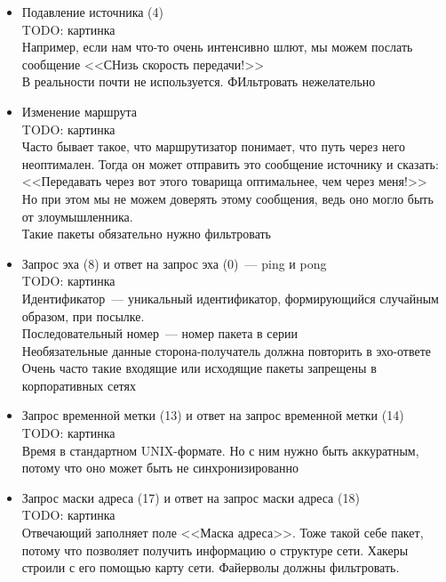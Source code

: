 
\begin{itemize}
    \item Подавление источника (4)\\
    TODO: картинка\\
    Например, если нам что-то очень интенсивно шлют, мы можем послать сообщение <<СНизь скорость передачи!>>\\
    В реальности почти не используется. ФИльтровать нежелательно
    \item Изменение маршрута\\
    TODO: картинка\\
    Часто бывает такое, что маршрутизатор понимает, что путь через него неоптимален. Тогда он может отправить это сообщение источнику и сказать: <<Передавать через вот этого товарища оптимальнее, чем через меня!>>\\
    Но при этом мы не можем доверять этому сообщения, ведь оно могло быть от злоумышленника.\\
    Такие пакеты обязательно нужно фильтровать
\end{itemize}


\begin{itemize}
    \item Запрос эха (8) и ответ на запрос эха (0)~--- ping и pong\\
    TODO: картинка\\
    Идентификатор~--- уникальный идентификатор, формирующийся случайным образом, при посылке.\\
    Последовательный номер~--- номер пакета в серии\\
    Необязательные данные сторона-получатель должна повторить в эхо-ответе\\
    Очень часто такие входящие или исходящие пакеты запрещены в корпоративных сетях 
    \item Запрос временной метки (13) и ответ на запрос временной метки (14)\\
    TODO: картинка\\
    Время в стандартном UNIX-формате. Но с ним нужно быть аккуратным, потому что оно может быть не синхронизированно
    \item Запрос маски адреса (17) и ответ на запрос маски адреса (18)\\
    TODO: картинка\\
    Отвечающий заполняет поле <<Маска адреса>>. Тоже такой себе пакет, потому что позволяет получить информацию о структуре сети. Хакеры строили с его помощью карту сети. Файерволы должны фильтровать.
\end{itemize}